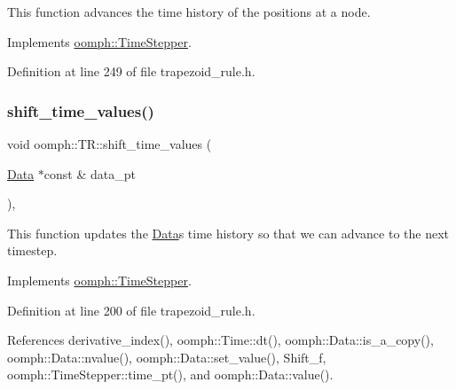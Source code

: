 This function advances the time history of the positions at a node. 



Implements \hyperlink{classoomph_1_1TimeStepper_a518b1bee5dc3aae8c5ef13560d1954ac}{oomph\+::\+Time\+Stepper}.



Definition at line 249 of file trapezoid\+\_\+rule.\+h.

\mbox{\label{classoomph_1_1TR_a4f8cc75e39263619c073076ae5bbab36}} 
\subsubsection{\texorpdfstring{shift\+\_\+time\+\_\+values()}{shift\_time\_values()}}
{\footnotesize\ttfamily void oomph\+::\+T\+R\+::shift\+\_\+time\+\_\+values (\begin{DoxyParamCaption}\item[{\hyperlink{classoomph_1_1Data}{Data} $\ast$const \&}]{data\+\_\+pt }\end{DoxyParamCaption})\hspace{0.3cm}{\ttfamily [inline]}, {\ttfamily [virtual]}}



This function updates the \hyperlink{classoomph_1_1Data}{Data}\textquotesingle{}s time history so that we can advance to the next timestep. 



Implements \hyperlink{classoomph_1_1TimeStepper_a010a3b03a23a1c48dd8ca10641427255}{oomph\+::\+Time\+Stepper}.



Definition at line 200 of file trapezoid\+\_\+rule.\+h.



References derivative\+\_\+index(), oomph\+::\+Time\+::dt(), oomph\+::\+Data\+::is\+\_\+a\+\_\+copy(), oomph\+::\+Data\+::nvalue(), oomph\+::\+Data\+::set\+\_\+value(), Shift\+\_\+f, oomph\+::\+Time\+Stepper\+::time\+\_\+pt(), and oomph\+::\+Data\+::value().

\mbox{\label{classoomph_1_1TR_ae77caf45f731bfc2cd5212f5934918d7}} 
